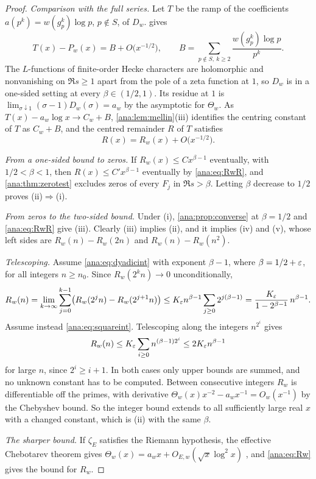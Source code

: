 \begin{proof}
\emph{Comparison with the full series.} Let $T$ be the ramp of the coefficients
$a(p^k)=w(g_p^k)\log p$, $p\notin S$, of $D_w$.  gives
\[
 T(x)-P_w(x)=B+O\bigl(x^{-1/2}\bigr),\qquad
 B=\sum_{p\notin S,\ k\ge2}\frac{w(g_p^k)\log p}{p^k}.
\]
The $L$-functions of finite-order Hecke characters are holomorphic and nonvanishing on $\Re s\ge1$
apart from the pole of a zeta function at $1$, so $D_w$ is in a one-sided setting at every
$\beta\in(1/2,1)$. Its residue at $1$ is $\lim_{\sigma\downarrow1}(\sigma-1)D_w(\sigma)=a_w$ by
the asymptotic for $\Theta_w$. As $T(x)-a_w\log x\to C_w+B$, \cref{ana:lem:mellin}(iii)
identifies the centring constant of $T$ as $C_w+B$, and the centred remainder $R$ of $T$
satisfies
\begin{equation}\label{ana:eq:RwR}
 R(x)=R_w(x)+O\bigl(x^{-1/2}\bigr).
\end{equation}

\emph{From a one-sided bound to zeros.} If $R_w(x)\le Cx^{\beta-1}$ eventually, with
$1/2<\beta<1$, then $R(x)\le C'x^{\beta-1}$ eventually by \eqref{ana:eq:RwR}, and
\cref{ana:thm:zerotest} excludes zeros of every $F_j$ in $\Re s>\beta$. Letting $\beta$
decrease to $1/2$ proves (ii)$\Rightarrow$(i).

\emph{From zeros to the two-sided bound.} Under (i), \cref{ana:prop:converse} at $\beta=1/2$ and
\eqref{ana:eq:RwR} give (iii). Clearly (iii) implies (ii), and it implies (iv) and (v), whose
left sides are $R_w(n)-R_w(2n)$ and $R_w(n)-R_w(n^2)$.

\emph{Telescoping.} Assume \eqref{ana:eq:dyadicint} with exponent $\beta-1$, where
$\beta=1/2+\varepsilon$, for all integers $n\ge n_0$. Since $R_w(2^kn)\to0$ unconditionally,
\[
 R_w(n)=\lim_{k\to\infty}\sum_{j=0}^{k-1}\bigl(R_w(2^jn)-R_w(2^{j+1}n)\bigr)
 \le K_\varepsilon n^{\beta-1}\sum_{j\ge0}2^{j(\beta-1)}=\frac{K_\varepsilon}{1-2^{\beta-1}}\,n^{\beta-1}.
\]
Assume instead \eqref{ana:eq:squareint}. Telescoping along the integers $n^{2^i}$ gives
\[
 R_w(n)\le K_\varepsilon\sum_{i\ge0}n^{(\beta-1)2^i}\le2K_\varepsilon n^{\beta-1}
\]
for large $n$, since $2^i\ge i+1$. In both cases only upper bounds are summed, and no unknown
constant has to be computed. Between consecutive integers $R_w$ is differentiable off the
primes, with derivative $\Theta_w(x)x^{-2}-a_wx^{-1}=O_w(x^{-1})$ by the Chebyshev bound. So the
integer bound extends to all sufficiently large real $x$ with a changed constant, which is (ii)
with the same $\beta$.

\emph{The sharper bound.} If $\zeta_E$ satisfies the Riemann hypothesis, the effective
Chebotarev theorem gives $\Theta_w(x)=a_wx+O_{E,w}(\sqrt x\log^2x)$
\cite{LagariasOdlyzko1977Effective,GrenieMolteni2019Explicit}, and \eqref{ana:eq:Rw} gives the
bound for $R_w$.
\end{proof}

